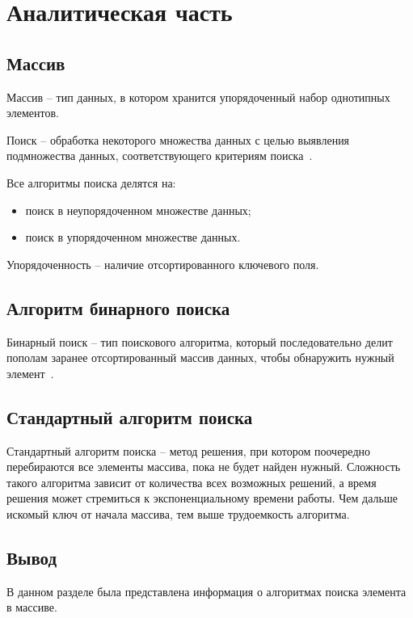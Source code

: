 \chapter{Аналитическая часть}
\section{Массив}

Массив -- тип данных, в котором хранится упорядоченный набор однотипных элементов. 

Поиск -- обработка некоторого множества данных с целью выявления подмножества данных, соответствующего критериям поиска~\cite{search}.

Все алгоритмы поиска делятся на:

\begin{itemize}
	\item поиск в неупорядоченном множестве данных;
	\item поиск в упорядоченном множестве данных.
\end{itemize}

Упорядоченность -- наличие отсортированного ключевого поля.

\section{Алгоритм бинарного поиска}

Бинарный поиск -- тип поискового алгоритма, который последовательно делит пополам заранее отсортированный массив данных, чтобы обнаружить нужный элемент~\cite{binary_search}.

\section{Стандартный алгоритм поиска}

Стандартный алгоритм поиска -- метод решения, при котором поочередно перебираются все элементы массива, пока не будет найден нужный.
Сложность такого алгоритма зависит от количества всех возможных решений, а время решения может стремиться к экспоненциальному времени работы. 
Чем дальше искомый ключ от начала массива, тем выше трудоемкость алгоритма. 

\section*{Вывод}

В данном разделе была представлена информация о алгоритмах поиска элемента в массиве.